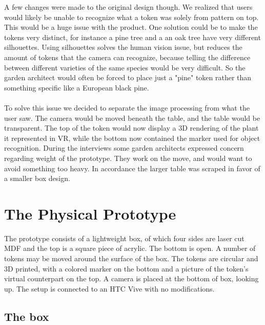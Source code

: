 A few changes were made to the original design though. We realized that users would likely be unable to recognize what a token was solely from pattern on top. This would be a huge issue with the product. One solution could be to make the tokens very distinct, for instance a pine tree and a an oak tree have very different silhouettes. Using silhouettes solves the human vision issue, but reduces the amount of tokens that the camera can recognize, because telling the difference between different varieties of the same species would be very difficult. So the garden architect would often be forced to place just a "pine" token rather than something specific like a European black pine.\\\\
To solve this issue we decided to separate the image processing from what the user saw. The camera would be moved beneath the table, and the table would be transparent. The top of the token would now display a 3D rendering of the plant it represented in VR, while the bottom now contained the marker used for object recognition. During the interviews some garden architects expressed concern regarding weight of the prototype. They work on the move, and would want to avoid something too heavy. In accordance the larger table was scraped in favor of a smaller box design. 

\section{The Physical Prototype}
The prototype consists of a lightweight box, of which four sides are laser cut MDF and the top is a square piece of acrylic. The bottom is open. A number of tokens may be moved around the surface of the box. The tokens are circular and 3D printed, with a colored marker on the bottom and a picture of the token's virtual counterpart on the top. A camera is placed at the bottom of box, looking up. 
The setup is connected to an HTC Vive with no modifications.

\subsection{The box}

